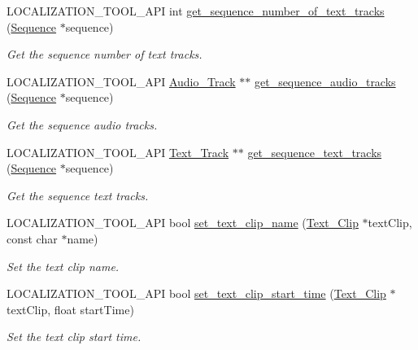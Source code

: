 \begin{DoxyCompactItemize}
L\+O\+C\+A\+L\+I\+Z\+A\+T\+I\+O\+N\+\_\+\+T\+O\+O\+L\+\_\+\+A\+PI int \mbox{\hyperlink{namespaceprz_adc24118c391c79c034821170e7249c4d}{get\+\_\+sequence\+\_\+number\+\_\+of\+\_\+text\+\_\+tracks}} (\mbox{\hyperlink{classprz_1_1_sequence}{Sequence}} $\ast$sequence)
\begin{DoxyCompactList}\small\item\em Get the sequence number of text tracks. \end{DoxyCompactList}\item 
L\+O\+C\+A\+L\+I\+Z\+A\+T\+I\+O\+N\+\_\+\+T\+O\+O\+L\+\_\+\+A\+PI \mbox{\hyperlink{classprz_1_1_audio___track}{Audio\+\_\+\+Track}} $\ast$$\ast$ \mbox{\hyperlink{namespaceprz_ac5117548474c20a5c1e5ac0998a7c89f}{get\+\_\+sequence\+\_\+audio\+\_\+tracks}} (\mbox{\hyperlink{classprz_1_1_sequence}{Sequence}} $\ast$sequence)
\begin{DoxyCompactList}\small\item\em Get the sequence audio tracks. \end{DoxyCompactList}\item 
L\+O\+C\+A\+L\+I\+Z\+A\+T\+I\+O\+N\+\_\+\+T\+O\+O\+L\+\_\+\+A\+PI \mbox{\hyperlink{classprz_1_1_text___track}{Text\+\_\+\+Track}} $\ast$$\ast$ \mbox{\hyperlink{namespaceprz_a9f420e41b11dc1a0b8c5a22a9288ca46}{get\+\_\+sequence\+\_\+text\+\_\+tracks}} (\mbox{\hyperlink{classprz_1_1_sequence}{Sequence}} $\ast$sequence)
\begin{DoxyCompactList}\small\item\em Get the sequence text tracks. \end{DoxyCompactList}\item 
L\+O\+C\+A\+L\+I\+Z\+A\+T\+I\+O\+N\+\_\+\+T\+O\+O\+L\+\_\+\+A\+PI bool \mbox{\hyperlink{namespaceprz_a0f13735aa236bd0a3aff7be58137e6a5}{set\+\_\+text\+\_\+clip\+\_\+name}} (\mbox{\hyperlink{classprz_1_1_text___clip}{Text\+\_\+\+Clip}} $\ast$text\+Clip, const char $\ast$name)
\begin{DoxyCompactList}\small\item\em Set the text clip name. \end{DoxyCompactList}\item 
L\+O\+C\+A\+L\+I\+Z\+A\+T\+I\+O\+N\+\_\+\+T\+O\+O\+L\+\_\+\+A\+PI bool \mbox{\hyperlink{namespaceprz_aa7768ced397410c261e9ac6d1fecade5}{set\+\_\+text\+\_\+clip\+\_\+start\+\_\+time}} (\mbox{\hyperlink{classprz_1_1_text___clip}{Text\+\_\+\+Clip}} $\ast$text\+Clip, float start\+Time)
\begin{DoxyCompactList}\small\item\em Set the text clip start time. \end{DoxyCompactList}\item 

\end{DoxyCompactItemize}
